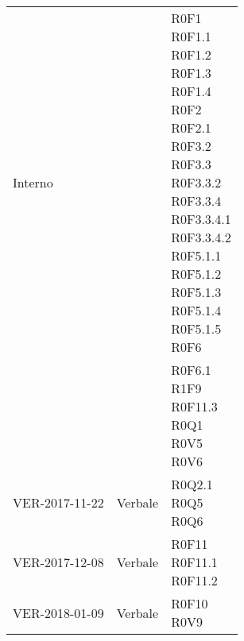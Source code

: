 \documentclass[AnalisiDeiRequisiti.tex]{subfiles}
\begin{document}
\begin{longtable}[H]{p{2cm}p{5cm}p{5cm}}
	\rowcolor{CRighePari}
	Interno & &  \makecell[tl]{ R0F1 \\
	 R0F1.1 \\
	 R0F1.2 \\
	 R0F1.3 \\
	 R0F1.4 \\
	 R0F2 \\
	 R0F2.1 \\
	 R0F3.2 \\
	 R0F3.3 \\
	 R0F3.3.2 \\
	 R0F3.3.4 \\
	 R0F3.3.4.1 \\
	 R0F3.3.4.2 \\
	 R0F5.1.1 \\
	 R0F5.1.2 \\
	 R0F5.1.3 \\
	 R0F5.1.4 \\
	 R0F5.1.5 \\
	 R0F6
	 } \\
	& & \makecell[tl]{
	 R0F6.1 \\
	 R1F9 \\
	 R0F11.3 \\
	 R0Q1 \\
	 R0V5 \\
	 R0V6 } \\  
	
	VER-2017-11-22 & Verbale &  \makecell[tl]{ R0Q2.1 \\
	 R0Q5 \\
	 R0Q6 } \\  
	
	VER-2017-12-08 & Verbale & \makecell[tl]{ R0F11 \\
	 R0F11.1 \\
	 R0F11.2 } \\  
	VER-2018-01-09 & Verbale & \makecell[tl]{ R0F10 \\
	R0V9 } \\ 
	

\end{longtable}
\end{document}
